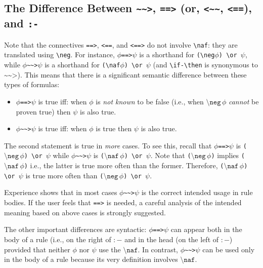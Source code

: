 \documentclass[11pt]{article}
\newcommand{\rnafarr}{\texttt{\textasciitilde\textasciitilde>}}
\newcommand{\lnafarr}{\texttt{<\textasciitilde\textasciitilde}}
\newcommand{\rnegarr}{\texttt{==>}}
\newcommand{\bs}{\textbackslash}
\newcommand{\RULELOGNAF}{{\texttt{{\bs}naf}}\xspace}
\newcommand{\RULELOGNEG}{{\texttt{{\bs}neg}}\xspace}
\begin{document}
\subsection{The Difference Between \rnafarr, \texttt{==>} (or,
  \lnafarr, \texttt{<==}), and \texttt{:-}}
\label{pg-strong-vs-weak-implication}

\index{\rnafarr vs. \texttt{==>} vs. \texttt{:-}}
Note that the connectives \texttt{==>}, \texttt{<==}, and \texttt{<==>} do
not involve \texttt{\RULELOGNAF}: they are translated using \texttt{\RULELOGNEG}. For
instance, \texttt{$\phi$==>$\psi$} is a shorthand for
\texttt{(\RULELOGNEG $\phi$) \bs{}or $\psi$}, while
$\phi$\rnafarr$\psi$ is a shorthand for \texttt{(\RULELOGNAF $\phi$) \bs{}or
  $\psi$} (and \texttt{\bs{}if-\bs{}then} is synonymous to $\rnafarr$).
This means that there is a significant semantic difference between these
types of formulas:
\begin{itemize}
\item \texttt{$\phi$==>$\psi$} is true iff:  when
  $\phi$ is \emph{not known}   to be false
  (i.e., when $\RULELOGNEG\,\phi$ \emph{cannot} be proven true) then $\psi$ is also true.
\item $\phi$\rnafarr$\psi$ is true iff:  when
  $\phi$ is true then $\psi$ is also true.
\end{itemize}
The second statement is true in \emph{more} cases.  To see this, recall
that \texttt{$\phi$==>$\psi$} is
\texttt{($\RULELOGNEG\,\phi$)\,\bs{}or\,$\psi$} while $\phi$\rnafarr$\psi$
is \texttt{($\RULELOGNAF\,\phi$)\,\bs{}or\,$\psi$}. Note that
\texttt{($\RULELOGNEG\,\phi$)} implies \texttt{($\RULELOGNAF\,\phi$)} i.e.,
the latter is true more often than the former. Therefore,
\texttt{($\RULELOGNAF\,\phi$)\,\bs{}or\,$\psi$} is true more often than
\texttt{($\RULELOGNEG\,\phi$)\,\bs{}or $\psi$}.

Experience shows that in most cases
$\phi$\rnafarr$\psi$ is the correct intended usage
in rule bodies. If the user feels that \texttt{==>} is needed, a careful
analysis of the intended meaning based on above cases is strongly suggested. 

The other important differences are syntactic: $\phi$\rnegarr$\psi$
can appear both in the body of a rule (i.e., on the right of $:-$ and in
the head (on the left of \texttt{$:-$}) provided that neither $\phi$ nor $\psi$ use
the $\RULELOGNAF$. In contrast, $\phi$\rnafarr$\psi$ can be used only in
the body of a rule because its very definition involves $\RULELOGNAF$.
\end{document}
